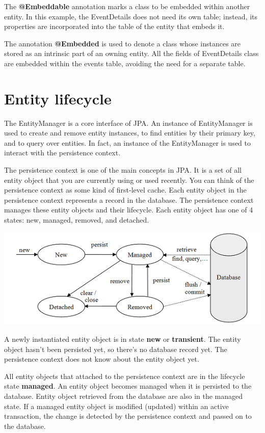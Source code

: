 The \textbf{@Embeddable} annotation marks a class to be embedded within another entity.
In this example,  the EventDetails does not need its own table; instead, its properties are incorporated into the table of the entity that embeds it.

The annotation \textbf{@Embedded}  is used to denote a class whose instances are stored as an intrinsic part of an owning entity.
 All the fields of EventDetails class are embedded within the events table, avoiding the need for a separate table.


\section{Entity lifecycle}

The EntityManager is a core interface of JPA.  An instance of EntityManager is used to create and remove  entity instances, to find entities by their primary key,  and to query over entities.  In fact,  an instance of the EntityManager is used to interact with the persistence context. 

The persistence context is one of the main concepts in JPA.
It is a set of all entity object that you are currently using or used recently. You can think of the persistence context as some kind of first-level cache. Each entity object in the persistence context represents a record in the database.
The persistence context manages these entity objects and their lifecycle. Each entity object has one of 4 states: new, managed, removed, and detached.

\includegraphics[width=\textwidth]{./images/chapter6/entity_states}

A newly instantiated entity object is in state \textbf{new} or \textbf{transient}. The entity object hasn't been persisted yet, so there's no database record yet. The persistence context does not know about the entity object yet. 

All entity objects that attached to the persistence context are in the lifecycle state \textbf{managed}. An entity object becomes managed when it is persisted to the database. Entity object retrieved from the database are also in the managed state.
If a managed entity object is modified (updated) within an active transaction, the change is detected by the persistence context and passed on to the database.

